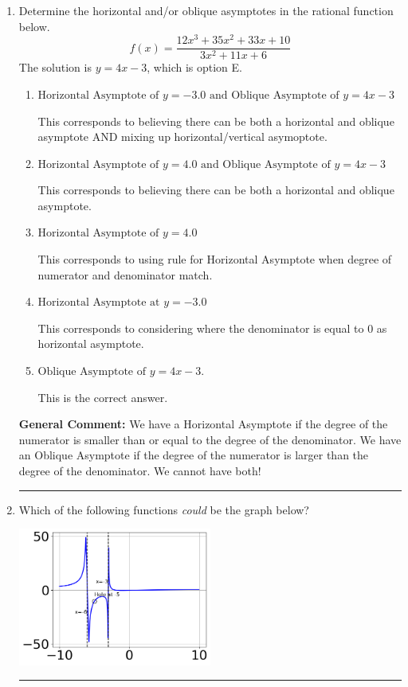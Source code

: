 \documentclass{extbook}[14pt]
\newcommand{\litem}[1]{\item #1

\rule{\textwidth}{0.4pt}}
\begin{document}
\begin{enumerate}\litem{
Determine the horizontal and/or oblique asymptotes in the rational function below.
\[ f(x) = \frac{12x^{3} +35 x^{2} +33 x + 10}{3x^{2} +11 x + 6} \]The solution is \( y = 4x -3 \), which is option E.\begin{enumerate}[label=\Alph*.]
\item \( \text{Horizontal Asymptote of } y = -3.0 \text{ and Oblique Asymptote of } y = 4x -3 \)

This corresponds to believing there can be both a horizontal and oblique asymptote AND mixing up horizontal/vertical asymoptote.
\item \( \text{Horizontal Asymptote of } y = 4.0 \text{ and Oblique Asymptote of } y = 4x -3 \)

This corresponds to believing there can be both a horizontal and oblique asymptote.
\item \( \text{Horizontal Asymptote of } y = 4.0  \)

This corresponds to using rule for Horizontal Asymptote when degree of numerator and denominator match.
\item \( \text{Horizontal Asymptote at } y = -3.0 \)

This corresponds to considering where the denominator is equal to 0 as horizontal asymptote.
\item \( \text{Oblique Asymptote of } y = 4x -3. \)

This is the correct answer.
\end{enumerate}

\textbf{General Comment:} We have a Horizontal Asymptote if the degree of the numerator is smaller than or equal to the degree of the denominator. We have an Oblique Asymptote if the degree of the numerator is larger than the degree of the denominator. We cannot have both!
}
\litem{
Which of the following functions \textit{could} be the graph below?

\begin{center}
    \includegraphics[width=0.5\textwidth]{../Figures/identifyGraphOfRationalFunctionCopyB.png}
\end{center}


}
\end{enumerate}
\end{document}
